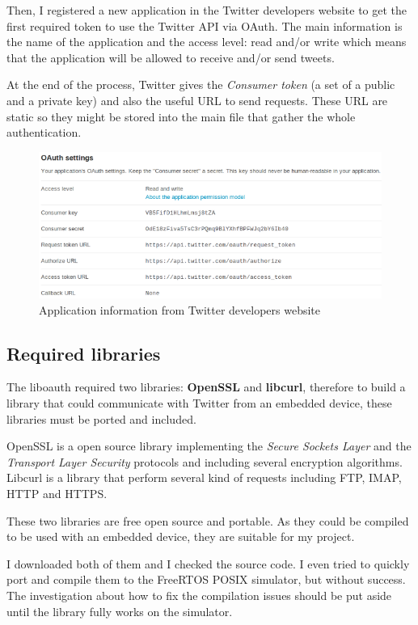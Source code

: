 Then, I registered a new application in the Twitter developers website to get the first required token to use the Twitter API via OAuth. The main information is the name of the application and the access level: read and/or write which means that the application will be allowed to receive and/or send tweets.

At the end of the process, Twitter gives the \textit{Consumer token} (a set of a public and a private key) and also the useful URL to send requests. These URL are static so they might be stored into the main file that gather the whole authentication. 

\clearpage
\begin{figure}[h]
  \centering
  \includegraphics[scale=0.75]{images/register.png}
  \caption{Application information from Twitter developers website}
\end{figure}


\subsection{Required libraries}

\hspace{15mm}The liboauth required two libraries: \textbf{OpenSSL} and \textbf{libcurl}, therefore to build a library that could communicate with Twitter from an embedded device, these libraries must be ported and included.

OpenSSL is a open source library implementing the \textit{Secure Sockets Layer} and the \textit{Transport Layer Security} protocols and including several encryption algorithms. Libcurl is a library that perform several kind of requests including FTP, IMAP, HTTP and HTTPS.

These two libraries are free open source and portable. As they could be compiled to be used with an embedded device, they are suitable for my project.

I downloaded both of them and I checked the source code. I even tried to quickly port and compile them to the FreeRTOS POSIX simulator, but without success. The investigation about how to fix the compilation issues should be put aside until the library fully works on the simulator.


\clearpage